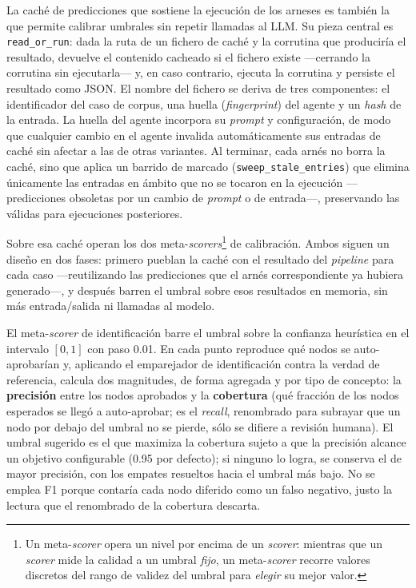 La caché de predicciones que sostiene la ejecución de los arneses es también la que permite
calibrar umbrales sin repetir llamadas al LLM. Su pieza central es \texttt{read\_or\_run}: dada la
ruta de un fichero de caché y la corrutina que produciría el resultado, devuelve el contenido
cacheado si el fichero existe —cerrando la corrutina sin ejecutarla— y, en caso contrario, ejecuta
la corrutina y persiste el resultado como JSON. El nombre del fichero se deriva de tres
componentes: el identificador del caso de corpus, una huella (\textit{fingerprint}) del agente y un
\textit{hash} de la entrada. La huella del agente incorpora su \textit{prompt} y configuración, de
modo que cualquier cambio en el agente invalida automáticamente sus entradas de caché sin afectar a
las de otras variantes. Al terminar, cada arnés no borra la caché, sino que aplica un barrido de
marcado (\texttt{sweep\_stale\_entries}) que elimina únicamente las entradas en ámbito que no se
tocaron en la ejecución —predicciones obsoletas por un cambio de \textit{prompt} o de entrada—,
preservando las válidas para ejecuciones posteriores.

Sobre esa caché operan los dos meta-\textit{scorers}\footnote{%
  Un meta-\textit{scorer} opera un nivel por encima de un \textit{scorer}: mientras que un
  \textit{scorer} mide la calidad a un umbral \emph{fijo}, un meta-\textit{scorer} recorre
  valores discretos del rango de validez del umbral para \emph{elegir} su mejor valor.%
} de calibración. Ambos siguen un diseño en dos
fases: primero pueblan la caché con el resultado del \textit{pipeline} para cada caso —reutilizando
las predicciones que el arnés correspondiente ya hubiera generado—, y después barren el umbral
sobre esos resultados en memoria, sin más entrada/salida ni llamadas al modelo.

El meta-\textit{scorer} de identificación barre el umbral sobre la confianza heurística en el
intervalo $[0,1]$ con paso 0.01. En cada punto reproduce qué nodos se auto-aprobarían y, aplicando
el emparejador de identificación contra la verdad de referencia, calcula dos magnitudes, de forma
agregada y por tipo de concepto: la \textbf{precisión} entre los nodos aprobados y la \textbf{cobertura}
(qué fracción de los nodos esperados se llegó a auto-aprobar; es el \textit{recall}, renombrado para
subrayar que un nodo por debajo del umbral no se pierde, sólo se difiere a revisión humana). El umbral
sugerido es el que maximiza la cobertura sujeto a que la precisión alcance un objetivo configurable
(0.95 por defecto); si ninguno lo logra, se conserva el de mayor precisión, con los empates resueltos
hacia el umbral más bajo. No se emplea F1 porque contaría cada nodo diferido como un falso
negativo, justo la lectura que el renombrado de la cobertura descarta.

